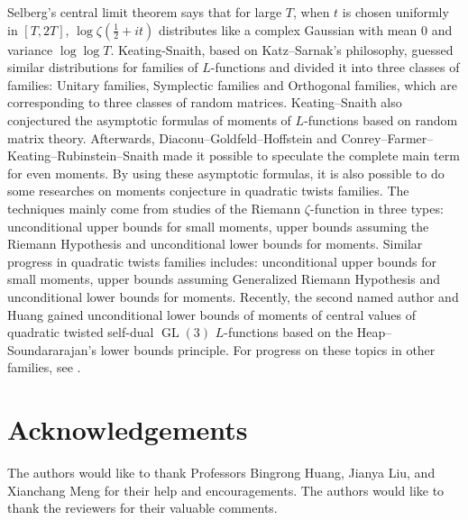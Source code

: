 \documentclass[12pt,reqno]{amsart}
\numberwithin{equation}{section}
\theoremstyle{plain}
\theoremstyle{definition}
\theoremstyle{remark}
\newcommand{\GL}{\operatorname{GL}}
\begin{document}
Selberg's central limit theorem says that for large $T$, when $t$ is chosen uniformly in $[T,2T]$, $\log\zeta(\frac{1}{2}+it)$ distributes like a complex Gaussian with mean 0 and variance $\log\log T$.
Keating-Snaith\cite{KS00a,KS00b}, based on Katz--Sarnak's philosophy\cite{KS99}, guessed similar distributions for families of $L$-functions and divided it into three classes of families: Unitary families, Symplectic families and Orthogonal families, which are corresponding to three classes of random matrices.
Keating--Snaith also conjectured the asymptotic formulas of moments of $L$-functions based on random matrix theory. Afterwards, Diaconu--Goldfeld--Hoffstein\cite{DGH03} and Conrey--Farmer--Keating--Rubinstein--Snaith\cite{CFKRS05} made it possible to speculate the complete main term for even moments.
By using these asymptotic formulas, it is also possible to do some researches on moments conjecture in quadratic twists families.
The techniques mainly come from studies of the Riemann $\zeta$-function in three types:
unconditional upper bounds for small moments\cite{BCR17,HRS19,HB81}, upper bounds assuming the Riemann Hypothesis\cite{Ha13,So09} and unconditional lower bounds for moments\cite{HS22,HB81,Mo71,RS13,Ra78,Ra80}.
Similar progress in quadratic twists families includes: unconditional upper bounds for small moments\cite{RS15}, upper bounds assuming Generalized Riemann Hypothesis\cite{GZ21a,MT14,Sono16,So09} and
unconditional lower bounds for moments\cite{GZ21b,HH22b,RS06}.
Recently, the second named author and Huang\cite{HH22b} gained unconditional lower bounds of moments of central values of quadratic twisted self-dual $\GL(3)$ $L$-functions based on the Heap--Soundararajan's lower bounds principle\cite{HS22}.
For progress on these topics in other families, see \cite{BFKMMS23,So21}.


\section*{Acknowledgements}
The authors would like to thank Professors Bingrong Huang, Jianya Liu, and Xianchang Meng for their help and encouragements.
The authors would like to thank the reviewers for their valuable comments.
\end{document}
